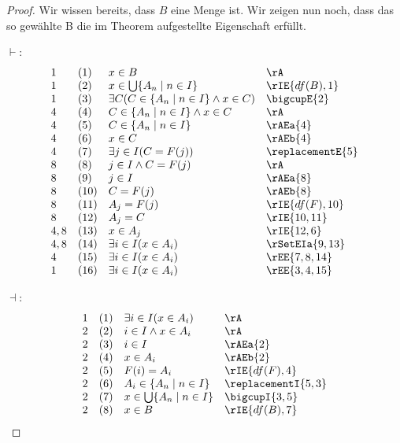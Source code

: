 \documentclass{book}
\theoremstyle{plain}
\theoremstyle{remark}
\theoremstyle{definition}
\begin{document}
\begin{proof}
    Wir wissen bereits, dass \(B\) eine Menge ist. Wir zeigen nun noch, dass das so gewählte B die im Theorem aufgestellte Eigenschaft erfüllt.

    
    \(\vdash\):
    \[
	\begin{array}{llll}
		1 &  (1) & x\in B & \rA \\
		1 &  (2) & x\in\bigcup\{A_n\mid n\in I\} & \rIE{df(B), 1} \\			
		1 &  (3) & \exists C(C\in \{A_n\mid n\in I\}\land x\in C)  & \bigcupE{2} \\
		4 &  (4) & C\in \{A_n\mid n\in I\}\land x\in C & \rA \\	
  	4 &  (5) & C\in \{A_n\mid n\in I\} & \rAEa{4} \\	
        4 &  (6) & x\in C & \rAEb{4} \\
        4 &  (7) & \exists j\in I(C = F(j)) & \replacementE{5} \\
        8 &  (8) & j\in I\land C = F(j) & \rA \\
        8 &  (9) & j\in I & \rAEa{8} \\
        8 &  (10) & C=F(j) & \rAEb{8} \\
        8 &  (11) & A_j = F(j) & \rIE{df(F), 10} \\
        8 &  (12) & A_j=C & \rIE{10,11} \\
        4,8 &  (13) & x\in A_j & \rIE{12,6} \\
        4,8 &  (14) & \exists i\in I(x\in A_i) & \rSetEIa{9,13} \\
        4 &  (15) & \exists i\in I(x\in A_i) & \rEE{7,8,14} \\
        1 &  (16) & \exists i\in I(x\in A_i) & \rEE{3,4,15} \\
	\end{array}
    \]

    \(\dashv\):
    \[
	\begin{array}{llll}
		1 &  (1) & \exists i\in I(x\in A_i) & \rA \\
		2 &  (2) & i\in I\land x\in A_i & \rA \\	
        2 &  (3) & i\in I & \rAEa{2} \\
        2 &  (4) & x\in A_i & \rAEb{2} \\
        2 &  (5) & F(i)=A_i & \rIE{df(F), 4} \\	
        2 &  (6) & A_i\in\{A_n\mid n\in I\} & \replacementI{5,3} \\	
        2 &  (7) & x\in\bigcup \{A_n\mid n\in I\} & \bigcupI{3,5} \\	
        2 &  (8) & x\in B & \rIE{df(B), 7} \\	
	\end{array}
    \]
\end{proof}
\end{document}
